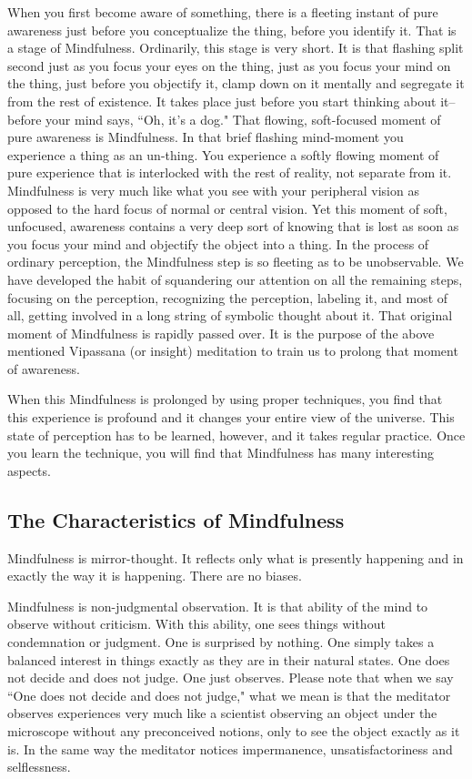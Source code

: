 When you first become aware of something, there is a fleeting instant of pure
awareness just before you conceptualize the thing, before you identify it. That
is a stage of Mindfulness. Ordinarily, this stage is very short. It is that
flashing split second just as you focus your eyes on the thing, just as you
focus your mind on the thing, just before you objectify it, clamp down on it
mentally and segregate it from the rest of existence. It takes place just before
you start thinking about it--before your mind says, ``Oh, it's a dog." That
flowing, soft-focused moment of pure awareness is Mindfulness. In that brief
flashing mind-moment you experience a thing as an un-thing. You experience a
softly flowing moment of pure experience that is interlocked with the rest of
reality, not separate from it. Mindfulness is very much like what you see with
your peripheral vision as opposed to the hard focus of normal or central vision.
Yet this moment of soft, unfocused, awareness contains a very deep sort of
knowing that is lost as soon as you focus your mind and objectify the object
into a thing. In the process of ordinary perception, the Mindfulness step is so
fleeting as to be unobservable. We have developed the habit of squandering our
attention on all the remaining steps, focusing on the perception, recognizing
the perception, labeling it, and most of all, getting involved in a long string
of symbolic thought about it. That original moment of Mindfulness is rapidly
passed over. It is the purpose of the above mentioned Vipassana (or insight)
meditation to train us to prolong that moment of awareness.

When this Mindfulness is prolonged by using proper techniques, you find that
this experience is profound and it changes your entire view of the universe.
This state of perception has to be learned, however, and it takes regular
practice. Once you learn the technique, you will find that Mindfulness has many
interesting aspects.

\subsection*{The Characteristics of Mindfulness} 
Mindfulness is mirror-thought. It reflects only what is presently happening and
in exactly the way it is happening. There are no biases.

Mindfulness is non-judgmental observation. It is that ability of the mind to
observe without criticism. With this ability, one sees things without
condemnation or judgment. One is surprised by nothing. One simply takes a
balanced interest in things exactly as they are in their natural states. One
does not decide and does not judge. One just observes. Please note that when we
say ``One does not decide and does not judge," what we mean is that the meditator
observes experiences very much like a scientist observing an object under the
microscope without any preconceived notions, only to see the object exactly as
it is. In the same way the meditator notices impermanence, unsatisfactoriness
and selflessness.

